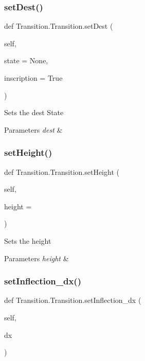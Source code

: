 \subsubsection{\texorpdfstring{setDest()}{setDest()}}
{\footnotesize\ttfamily def Transition.\+Transition.\+set\+Dest (\begin{DoxyParamCaption}\item[{}]{self,  }\item[{}]{state = {\ttfamily None},  }\item[{}]{inscription = {\ttfamily True} }\end{DoxyParamCaption})}



Sets the dest State   


\begin{DoxyParams}{Parameters}
{\em dest} & \\
\hline
\end{DoxyParams}
\mbox{\label{classTransition_1_1Transition_ae6ad9f99cb1df775514cda39f64b4a4f}} 
\subsubsection{\texorpdfstring{setHeight()}{setHeight()}}
{\footnotesize\ttfamily def Transition.\+Transition.\+set\+Height (\begin{DoxyParamCaption}\item[{}]{self,  }\item[{}]{height = {} }\end{DoxyParamCaption})}



Sets the height   


\begin{DoxyParams}{Parameters}
{\em height} & \\
\hline
\end{DoxyParams}
\mbox{\label{classTransition_1_1Transition_a90073d47fc1267a92dc9ae9638c0f2d3}} 
\subsubsection{\texorpdfstring{setInflection\_dx()}{setInflection\_dx()}}
{\footnotesize\ttfamily def Transition.\+Transition.\+set\+Inflection\+\_\+dx (\begin{DoxyParamCaption}\item[{}]{self,  }\item[{}]{dx }\end{DoxyParamCaption})}



